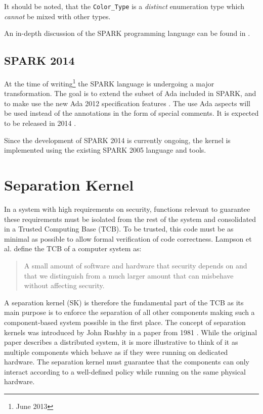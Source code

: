 It should be noted, that the \texttt{Color\_Type} is a \emph{distinct}
enumeration type which \emph{cannot} be mixed with other types.

An in-depth discussion of the SPARK programming language can be found in
\cite{BarnesSPARK}.

\subsection{SPARK 2014}
At the time of writing\footnote{June 2013} the SPARK language is undergoing a
major transformation. The goal is to extend the subset of Ada included in SPARK,
and to make use the new Ada 2012 specification features \cite{Ada2012}. The use
Ada aspects will be used instead of the annotations in the form of special
comments. It is expected to be released in 2014 \cite{SPARK2014:Announcement}.

Since the development of SPARK 2014 is currently ongoing, the kernel is
implemented using the existing SPARK 2005 language and tools.




\section{Separation Kernel}
In a system with high requirements on security, functions relevant
to guarantee these requirements must be isolated from the rest of
the system and consolidated in a Trusted Computing Base (TCB).
To be trusted, this code must be as minimal as possible to allow formal
verification of code correctness. Lampson et al.
\cite{Lampson:1991:ADS:121133.121160} define the TCB of a computer system as:
\begin{quote}
	A small amount of software and hardware that security depends on and
	that we distinguish from a much larger amount that can misbehave without
	affecting security.
\end{quote}

A separation kernel (SK) is therefore the fundamental
part of the TCB as its main purpose is to enforce the separation of all other
components making such a component-based system possible in the first place. The
concept of separation kernels was introduced by John Rushby in a paper from 1981
\cite{rushby1981}. While the original paper describes a distributed system, it
is more illustrative to think of it as multiple components which behave as if
they were running on dedicated hardware. The separation kernel must guarantee
that the components can only interact according to a well-defined policy while
running on the same physical hardware.

